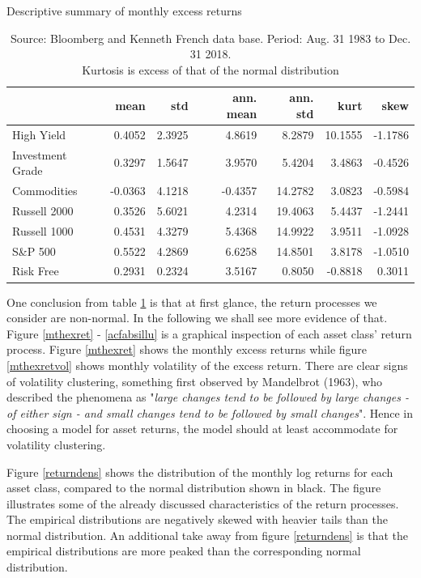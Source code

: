 \documentclass[11pt,a4paper,oneside]{article}
\begin{document}
\begin{table}[h!]
\centering
\captionsetup{justification=centering,margin=0.6cm}
\caption{Descriptive summary of monthly excess returns}
\label{descriptive_statistics}
\begin{tabular}{lrrrrrr}
\toprule
{} &    mean &     std &  ann. mean &  ann. std &  kurt &  skew \\
\midrule
High Yield       &  0.4052 &  2.3925 &     4.8619 &    8.2879 &   10.1555 &   -1.1786 \\
Investment Grade &  0.3297 &  1.5647 &     3.9570 &    5.4204 &    3.4863 &   -0.4526 \\
Commodities      & -0.0363 &  4.1218 &    -0.4357 &   14.2782 &    3.0823 &   -0.5984 \\
Russell 2000     &  0.3526 &  5.6021 &     4.2314 &   19.4063 &    5.4437 &   -1.2441 \\
Russell 1000     &  0.4531 &  4.3279 &     5.4368 &   14.9922 &    3.9511 &   -1.0928 \\
S\&P 500          &  0.5522 &  4.2869 &     6.6258 &   14.8501 &    3.8178 &   -1.0510 \\
Risk Free        &  0.2931 &  0.2324 &     3.5167 &    0.8050 &   -0.8818 &    0.3011 \\
\bottomrule
\end{tabular}
\caption*{Source: Bloomberg and Kenneth French data base.
Period: Aug. 31 1983 to Dec. 31 2018. \\ Kurtosis is excess of that of the normal distribution}
\end{table}

\noindent One conclusion from table \ref{descriptive_statistics} is that at first glance, the return processes we consider are non-normal. In the following we shall see more evidence of that. Figure \ref{mthexret} - \ref{acfabsillu} is a graphical inspection of each asset class' return process. Figure \ref{mthexret} shows the monthly excess returns while figure \ref{mthexretvol} shows monthly volatility of the excess return. There are clear signs of volatility clustering, something first observed by Mandelbrot (1963), who described the phenomena as "\textit{large changes tend to be followed by large changes - of either sign - and small changes tend to be followed by small changes}"\cite{mandelbrot}. Hence in choosing a model for asset returns, the model should at least accommodate for volatility clustering. 

Figure \ref{returndens} shows the distribution of the monthly log returns for each asset class, compared to the normal distribution shown in black. The figure illustrates some of the already discussed characteristics of the return processes. The empirical distributions are negatively skewed with heavier tails than the normal distribution. An additional take away from figure \ref{returndens} is that the empirical distributions are more peaked than the corresponding normal distribution. 
\end{document}
